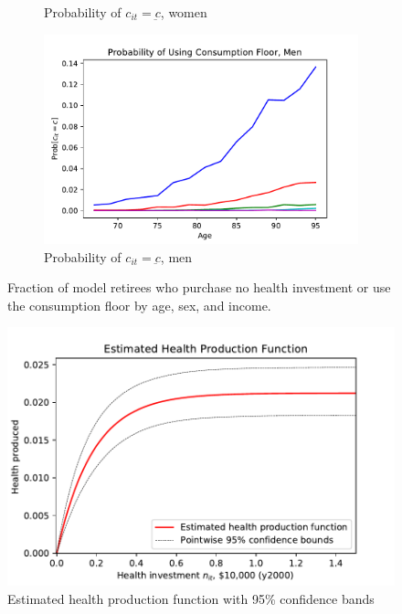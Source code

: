 \documentclass[12pt,pdftex,letterpaper]{article}
\newcommand{\Con}{c}
\newcommand{\ConFloor}{\underbar{\Con}}
\begin{document}
\begin{figure}[h!]
\begin{subfigure}[b]{0.49\textwidth}
        \caption{Probability of $\Con_{it}=\ConFloor$, women}
    \end{subfigure}
    \begin{subfigure}[b]{0.49\textwidth}
        \centering
        \includegraphics[width=\textwidth]{../Figures/cFloorMen.pdf}
        \caption{Probability of $\Con_{it}=\ConFloor$, men}
    \end{subfigure}
    \caption{Fraction of model retirees who purchase no health investment or use the consumption floor by age, sex, and income.}
    \label{fig:ZeroInvstAndConFloor}
\end{figure}


\newpage


\begin{figure}[h!]
\begin{center}
\includegraphics[scale=0.9]{../Figures/HealthProdFunc.pdf}
\end{center}
\vspace{-0.5cm}
\caption{Estimated health production function with 95\% confidence bands}
\label{fig:HealthProdFunc}
\end{figure}
\end{document}
